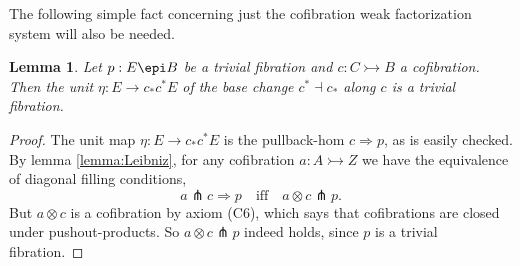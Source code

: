 \documentclass[12pt]{article}
\newcommand{\mono}{\ensuremath{\rightarrowtail}}
\newcommand{\ra}{\ensuremath{\rightarrow}}
\newtheorem{lemma}[theorem]{Lemma}
\theoremstyle{remark}
\theoremstyle{definition}
\begin{document}
The following simple fact concerning just the cofibration weak factorization system will also be needed.

\begin{lemma}\label{lemma:etaTF}
Let $p: E \epi B$ be a trivial fibration and $c : C\mono B$ a cofibration.  Then the unit $\eta:E \ra c_*c^*E$ of the base change $c^*\dashv c_*$ along $c$ is a trivial fibration.
\end{lemma}

\begin{proof}
The unit map $\eta:E \ra c_*c^*E$ is the pullback-hom $c\!\Rightarrow\! p$, as is easily checked.
By lemma \ref{lemma:Leibniz}, for any cofibration $a : A \mono Z$ we have the equivalence of diagonal filling conditions,
\[
a \pitchfork c\!\Rightarrow\!p  \quad\text{iff}\quad a\!\otimes\!c \pitchfork p.
\]
But $a\otimes c$ is a cofibration by axiom (C6), which says that cofibrations are closed under pushout-products.  So $a\otimes c \pitchfork p$ indeed holds, since $p$ is a trivial fibration.
\end{proof}
\end{document}

